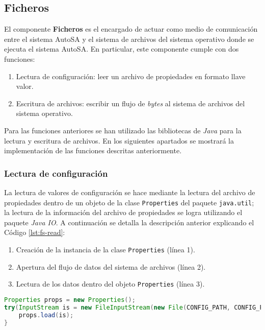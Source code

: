 \subsection{Ficheros}
El componente \textbf{Ficheros} es el encargado de actuar como medio de comunicación entre el sistema AutoSA y el sistema de archivos del sistema operativo donde se ejecuta el sistema AutoSA. En particular, este componente cumple con dos funciones:
\begin{enumerate}
	\item Lectura de configuración: leer un archivo de propiedades en formato llave valor.
	\item Escritura de archivos: escribir un flujo de \textit{bytes} al sistema de archivos del sistema operativo.
\end{enumerate}
Para las funciones anteriores se han utilizado las bibliotecas de \textit{Java} para la lectura y escritura de archivos. En los siguientes apartados se mostrará la implementación de las funciones descritas anteriormente.
\subsubsection{Lectura de configuración}
La lectura de valores de configuración se hace mediante la lectura del archivo de propiedades dentro de un objeto de la clase \texttt{Properties} del paquete \texttt{java.util}; la lectura de la información del archivo de propiedades se logra utilizando el paquete \textit{Java IO}. A continuación se detalla la descripción anterior explicando el Código \ref{lst:fs-read}:
\begin{enumerate}
 	\item Creación de la instancia de la clase \texttt{Properties} (línea 1).
 	\item Apertura del flujo de datos del sistema de archivos (línea 2).
 	\item Lectura de los datos dentro del objeto \texttt{Properties} (línea 3).
\end{enumerate}
\begin{lstlisting}[language=Java, caption={Lectura de un archivo de propiedades.}, captionpos=b, label={lst:fs-read}]
Properties props = new Properties();
try(InputStream is = new FileInputStream(new File(CONFIG_PATH, CONFIG_FILENAME));){
	props.load(is);
}
\end{lstlisting}
